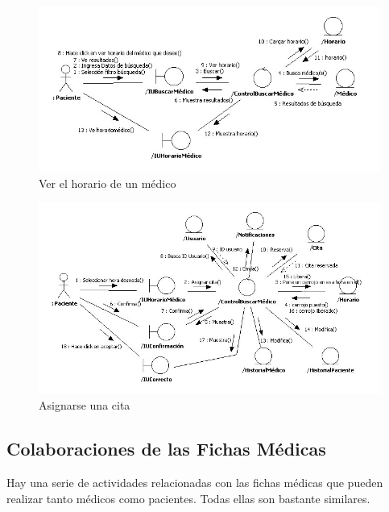 		\begin{figure}[H]
		  \centering
		    \includegraphics[width=16cm]{img/jpg/colaboraciones/30_VerhoarioMedico.jpg}
		  \caption{Ver el horario de un médico}
		  \label{fig:col_verhorario_paciente}
		\end{figure}
		
		\begin{figure}[H]
		  \centering
		    \includegraphics[width=16cm]{img/jpg/colaboraciones/31_AsignarseCita.jpg}
		  \caption{Asignarse una cita}
		  \label{fig:col_asigcita_paciente}
		\end{figure}
		
		

	\newpage
	\subsection{Colaboraciones de las Fichas Médicas} %
	\label{sub:colaboraciones_de_las_fichas_medicas}
	
		Hay una serie de actividades relacionadas con las fichas médicas que pueden realizar tanto médicos como pacientes. Todas ellas son bastante similares.
		
